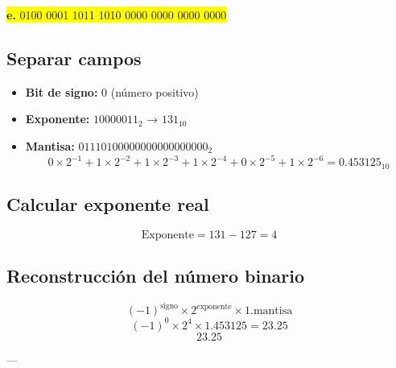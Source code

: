 \documentclass[a4paper,12pt]{article}
\begin{document}
	\begin{center}
	\colorbox{yellow}{\textbf{e.} 0100 0001 1011 1010 0000 0000 0000 0000}
	
	\subsection*{Separar campos}
	
	\begin{itemize}
		\item \textbf{Bit de signo:} 0 (número positivo)
		\item \textbf{Exponente:} $10000011_2$ → $131_{10}$
		\item \textbf{Mantisa:} $01110100000000000000000_2$ 
		\[
		0\times2^{-1} + 1\times2^{-2} + 1\times2^{-3} + 1\times2^{-4} + 0\times2^{-5} + 1\times2^{-6} = 0.453125_{10}
		\]
	\end{itemize}
	
	\subsection*{Calcular exponente real}
	
	\[
	\text{Exponente} = 131 - 127 = 4
	\]
	
	
	
	\subsection*{Reconstrucción del número binario}	
	\[
	(-1)^{\text{signo}} \times 2^{\text{exponente}} \times 1.\text{mantisa}
	\]
	\[
	(-1)^0 \times 2^4 \times 1.453125 = 23.25
	\]
	\vspace{1em}
	\[
	\boxed{23.25}
	\]
	
	---
	\end{center}
\end{document}
